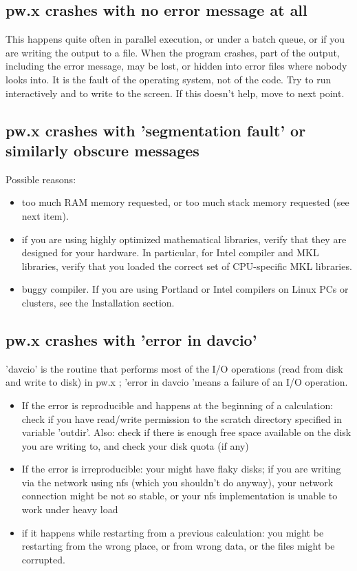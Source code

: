 \documentclass[12pt,a4paper]{article}
\begin{document}
\subsection{pw.x crashes with no error message at all}
This happens quite often in parallel execution, or under a batch
queue, or if you are writing the output to a file. When the program
crashes, part of the output, including the error message, may be lost,
or hidden into error files where nobody looks into. It is the fault of
the operating system, not of the code. Try to run interactively 
and to write to the screen. If this doesn't help, move to next point.

\subsection{pw.x crashes with 'segmentation fault' or similarly
  obscure messages} 
Possible reasons:
\begin{itemize}
\item  too much RAM memory requested, or too much stack memory
  requested (see next item). 
\item if you are using highly optimized mathematical libraries, verify
  that they are designed for your hardware. In particular, for Intel
  compiler  and MKL libraries, verify that you loaded the correct set
  of CPU-specific MKL libraries. 
\item buggy compiler. If you are using Portland or Intel compilers on
  Linux PCs or clusters, see the Installation section. 
\end{itemize}

\subsection{pw.x crashes with 'error in davcio'}
'davcio' is the routine that performs most of the I/O operations (read
from disk and write to disk) in pw.x ; 'error in davcio 'means a
failure of an I/O operation.  
\begin{itemize}
\item If the error is reproducible and happens at the beginning of a
  calculation: check if you have read/write permission to the scratch
  directory specified in variable 'outdir'. Also: check if there is
  enough free space available on the disk you are writing to, and
  check your disk quota (if any) 
\item If the error is irreproducible: your might have flaky disks; if
  you are writing via the network using nfs (which you shouldn't do
  anyway), your network connection might be not so stable, or your nfs
  implementation is unable to work under heavy load 
\item if it happens while restarting from a previous calculation: you
  might be restarting from the wrong place, or from wrong  data, or
  the files might be corrupted. 
\end{itemize}
\end{document}
